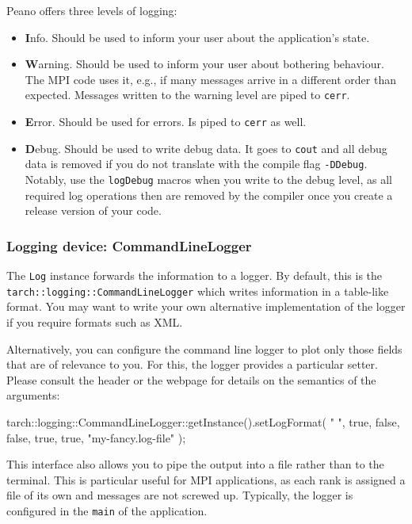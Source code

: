 Peano offers three levels of logging:
\begin{itemize}
  \item {\textbf Info}. Should be used to inform your user about the application's
  state.
  \item {\textbf Warning}. Should be used to inform your user about bothering
  behaviour.
  The MPI code uses it, e.g., if many messages arrive in a different order than
  expected. Messages written to the warning level are piped to
  \texttt{cerr}.
  \item {\textbf Error}. Should be used for errors. Is piped to \texttt{cerr} as
  well.
  \item {\textbf Debug}. Should be used to write debug data. It goes to
  \texttt{cout} and all debug data is removed if you do not translate with the compile flag
  \texttt{-DDebug}. Notably, use the \texttt{logDebug} macros when you write to
  the debug level, as all required log operations then are removed by the
  compiler once you create a release version of your code.
\end{itemize}



\subsubsection{Logging device: CommandLineLogger}

The \texttt{Log} instance forwards the information to a logger. By default, this
is the \\ \texttt{tarch::logging::CommandLineLogger} which writes information
in a table-like format. You may want to write your own alternative
implementation of the logger if you require formats such as XML.

Alternatively, you can configure the command line logger to plot only those
fields that are of relevance to you.
For this, the logger provides a particular setter.
Please consult the header or the webpage for details on the semantics of the
arguments:
\begin{code}
tarch::logging::CommandLineLogger::getInstance().setLogFormat(
  " ", true, false, false, true, true, "my-fancy.log-file" );
\end{code} 

\noindent
This interface also allows you to pipe the output into a file rather than to the
terminal.
This is particular useful for MPI applications, as each rank is assigned a file
of its own and messages are not screwed up.
Typically, the logger is configured in the \texttt{main} of the application.

